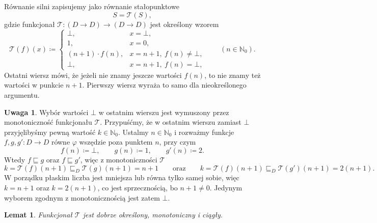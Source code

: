 \documentclass[11pt,a4paper]{article}
\theoremstyle{definition}
\newtheorem{uwaga}[definicja]{Uwaga}
\theoremstyle{plain}
\newtheorem{lemat}[definicja]{Lemat}
\newcommand{\bt}{\bot}                            %
\begin{document}
Równanie silni zapisujemy jako równanie stałopunktowe
\[
S=\mathcal T(S),
\]
gdzie funkcjonał $\mathcal{T}:(D\to D)\to(D\to D)$ jest określony
wzorem
\[
\mathcal{T}(f)(x)\coloneqq
\begin{cases}
	\bt, & x=\bt,\\
	1, & x=0,\\
	(n+1)\cdot f(n), & x=n+1,\ f(n)\neq\bt,\\
	\bt, & x=n+1,\ f(n)=\bt,
\end{cases}
\qquad(n\in\mathbb N_0).
\]
Ostatni wiersz mówi, że jeżeli nie znamy jeszcze wartości $f(n)$, to nie
znamy też wartości w punkcie $n+1$. Pierwszy wiersz wyraża to samo dla
nieokreślonego argumentu.

\begin{uwaga}\label{uw:silnia_bt}
	Wybór wartości $\bt$ w ostatnim wierszu jest wymuszony przez
	monotoniczność funkcjonału $\mathcal T$. Przypuśćmy, że w ostatnim
	wierszu zamiast $\bt$ przyjęlibyśmy pewną wartość $k\in\mathbb N_0$.
	Ustalmy $n\in\mathbb N_0$ i rozważmy funkcje $f,g,g':D\to D$ równe
	$\varphi$ wszędzie poza punktem $n$, przy czym
	\[
	f(n)\coloneqq\bt,
	\qquad
	g(n)\coloneqq1,
	\qquad
	g'(n)\coloneqq2.
	\]
	Wtedy $f\sqsubseteq g$ oraz $f\sqsubseteq g'$, więc z monotoniczności
	$\mathcal T$
	\[
	k=\mathcal T(f)(n+1)\sqsubseteq_D\mathcal T(g)(n+1)=n+1
	\qquad\text{oraz}\qquad
	k=\mathcal T(f)(n+1)\sqsubseteq_D\mathcal T(g')(n+1)=2(n+1).
	\]
	W porządku płaskim liczba jest mniejsza lub równa tylko samej sobie,
	więc $k=n+1$ oraz $k=2(n+1)$, co jest sprzecznością, bo $n+1\neq0$.
	Jedynym wyborem zgodnym z monotonicznością jest zatem $\bt$.
\end{uwaga}

\begin{lemat}\label{lem:silnia_F}
	Funkcjonał $\mathcal T$ jest dobrze określony, monotoniczny i ciągły.
\end{lemat}
\end{document}

